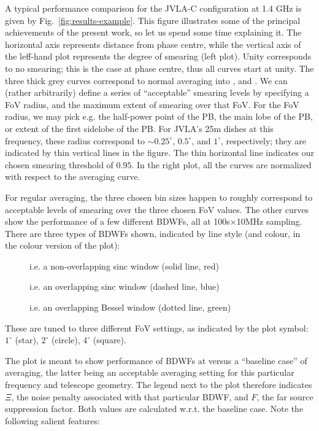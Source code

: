 \documentclass[useAMS,usenatbib]{mn2e}
\begin{document}
A typical performance comparison for the JVLA-C configuration at 1.4 GHz is given by Fig.~\ref{fig:results-example}.
This figure illustrates some of the principal achievements of the present work, so let us spend some time explaining it.
The horizontal axis represents distance from phase centre, while the vertical axis of the leff-hand plot represents  the
degree of smearing (left plot). Unity corresponds to no smearing; this is the case at phase centre, thus all curves
start at unity. The three thick grey curves correspond to normal averaging into ,  and
. We can (rather arbitrarily) define a series of ``acceptable'' smearing levels by specifying a  FoV
radius, and the maximum extent of smearing over that FoV. For the FoV radius, we may pick e.g. the half-power point  of
the PB, the main lobe of the PB, or extent of the first sidelobe of the PB. For JVLA's 25m dishes at this frequency,
these radius correspond to $\sim0.25^\circ$, $0.5^\circ$, and $1^\circ$, respectively; they are indicated by thin
vertical lines in the figure. The thin horizontal line indicates our chosen smearing threshold of $0.95$. In the right
plot,  all the curves are normalized with respect to the  averaging curve.

For regular averaging, the three chosen bin sizes happen to roughly correspond to acceptable levels of smearing over the
three chosen FoV values. The other curves show the performance of a few different BDWFs, all at 100s$\times$10MHz
sampling. There are three types of BDWFs shown, indicated by line style (and colour, in the colour version of the plot):
\begin{description}
\item[] i.e. a non-overlapping sinc window (solid line, red)
\item[] i.e. an overlapping sinc window (dashed line, blue)
\item[] i.e. an overlapping Bessel window (dotted line, green)
\end{description}
These are tuned to three different FoV settings, as indicated by the plot symbol: $1^\circ$ (star), $2^\circ$ (circle),
$4^\circ$ (square). 

The plot is meant to show performance of BDWFs at  versus a ``baseline case'' of  averaging, 
the latter being an acceptable averaging setting for this particular frequency and telescope geometry. The legend 
next to the plot therefore indicates $\Xi$, the noise penalty associated with that particular BDWF, and $F$, the 
far source suppression factor. Both values are calculated w.r.t. the baseline case. Note the following salient features:
\end{document}
